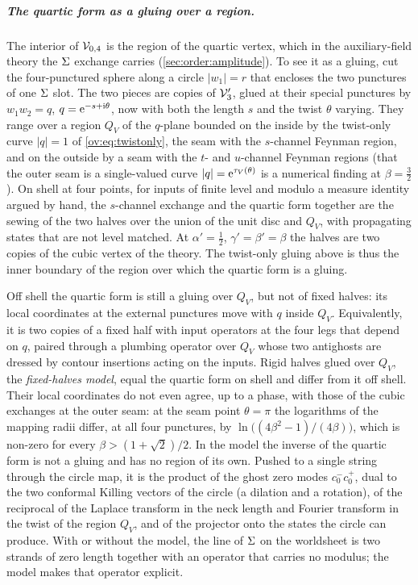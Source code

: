 \subparagraph{The quartic form as a gluing over a region.}
The interior of ${\mathcal{V}}_{0,4}$ is the region of the quartic vertex, which in the auxiliary-field theory the $\Sigma$ exchange carries (\cref{sec:order:amplitude}).
To see it as a gluing, cut the four-punctured sphere along a circle $|w_1|=r$ that encloses the two punctures of one $\Sigma$ slot.
The two pieces are copies of ${\mathcal{V}}_3'$, glued at their special punctures by $w_1w_2=q$, $q=\mathrm{e}^{-s+\mathrm{i}\theta}$, now with both the length $s$ and the twist $\theta$ varying.
They range over a region $Q_V$ of the $q$-plane bounded on the inside by the twist-only curve $|q|=1$ of \eqref{ov:eq:twistonly}, the seam with the $s$-channel Feynman region, and on the outside by a seam with the $t$- and $u$-channel Feynman regions (that the outer seam is a single-valued curve $|q|=\mathrm{e}^{\tau_V(\theta)}$ is a numerical finding at $\beta=\tfrac32$).
On shell at four points, for inputs of finite level and modulo a measure identity argued by hand, the $s$-channel exchange and the quartic form together are the sewing of the two halves over the union of the unit disc and $Q_V$, with propagating states that are not level matched.
At $\alpha'=\tfrac12$, $\gamma'=\beta'=\beta$ the halves are two copies of the cubic vertex of the theory.
The twist-only gluing above is thus the inner boundary of the region over which the quartic form is a gluing.

Off shell the quartic form is still a gluing over $Q_V$, but not of fixed halves: its local coordinates at the external punctures move with $q$ inside $Q_V$.
Equivalently, it is two copies of a fixed half with input operators at the four legs that depend on $q$, paired through a plumbing operator over $Q_V$ whose two antighosts are dressed by contour insertions acting on the inputs.
Rigid halves glued over $Q_V$, the \emph{fixed-halves model}, equal the quartic form on shell and differ from it off shell.
Their local coordinates do not even agree, up to a phase, with those of the cubic exchanges at the outer seam: at the seam point $\theta=\pi$ the logarithms of the mapping radii differ, at all four punctures, by $\ln\big((4\beta^2-1)/(4\beta)\big)$, which is non-zero for every $\beta>(1+\sqrt2)/2$.
In the model the inverse of the quartic form is not a gluing and has no region of its own.
Pushed to a single string through the circle map, it is the product of the ghost zero modes $c_0^-c_0^+$, dual to the two conformal Killing vectors of the circle (a dilation and a rotation), of the reciprocal of the Laplace transform in the neck length and Fourier transform in the twist of the region $Q_V$, and of the projector onto the states the circle can produce.
With or without the model, the line of $\Sigma$ on the worldsheet is two strands of zero length together with an operator that carries no modulus; the model makes that operator explicit.

